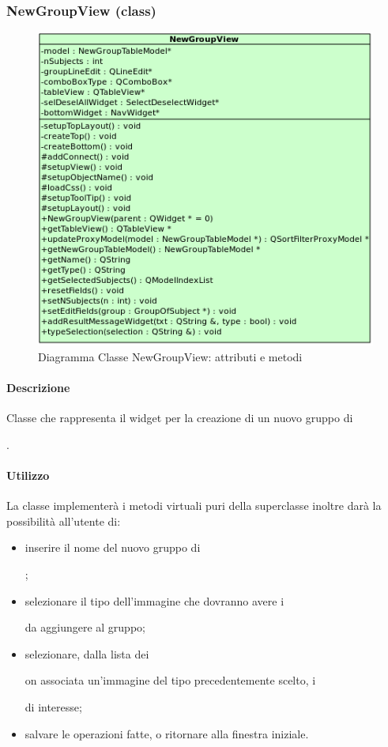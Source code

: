 \subsubsection{NewGroupView (class)}
\label{speNgroV}
\begin{figure}[!h]
\centering
			\includegraphics[width=0.75\linewidth]{./Content/Immagini/view/NewGroupView.png}
			\caption{Diagramma Classe NewGroupView: attributi e metodi}
			\label{cl_ngro}
\end{figure}
\paragraph{Descrizione \\}
Classe che rappresenta il widget per la creazione di un nuovo gruppo di \subject{}.
\paragraph{Utilizzo\\}
La classe implementerà i metodi virtuali puri della superclasse inoltre darà la possibilità all'utente di:
\begin{itemize}
\item inserire il nome del nuovo gruppo di \subject{};
\item selezionare il tipo dell'immagine che dovranno avere i \subject{} da aggiungere al gruppo;
\item selezionare, dalla lista dei \subject con associata un'immagine del tipo precedentemente scelto, i \subject{} di interesse;
\item salvare le operazioni fatte, o ritornare alla finestra iniziale.
\end{itemize}
